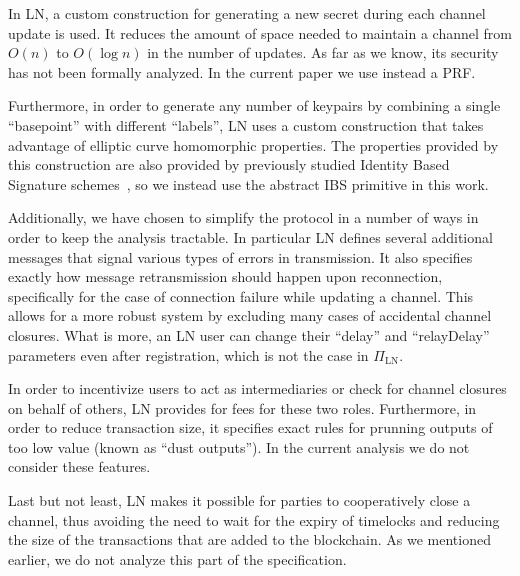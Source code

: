   \begin{remark}

    In LN, a custom construction for generating a new secret during each channel
    update is used. It reduces the amount of space needed to maintain a channel
    from $O(n)$ to $O(\log n)$ in the number of updates. As far as we know, its
    security has not been formally analyzed. In the current paper we use instead
    a PRF.

    Furthermore, in order to generate any number of keypairs by combining a
    single ``basepoint'' with different ``labels'', LN uses a custom
    construction that takes advantage of elliptic curve homomorphic properties.
    The properties provided by this construction are also provided by previously
    studied Identity Based Signature schemes~\cite{ibsshamir,ibspaterson}, so we
    instead use the abstract IBS primitive in this work. 

    Additionally, we have chosen to simplify the protocol in a number of ways in
    order to keep the analysis tractable. In particular LN defines several
    additional messages that signal various types of errors in transmission. It
    also specifies exactly how message retransmission should happen upon
    reconnection, specifically for the case of connection failure while updating
    a channel. This allows for a more robust system by excluding many cases of
    accidental channel closures. What is more, an LN user can change their
    ``delay'' and ``relayDelay'' parameters even after registration, which is
    not the case in $\Pi_{\mathrm{LN}}$.

    In order to incentivize users to act as intermediaries or check for channel
    closures on behalf of others, LN provides for fees for these two roles.
    Furthermore, in order to reduce transaction size, it specifies exact rules
    for prunning outputs of too low value (known as ``dust outputs''). In the
    current analysis we do not consider these features.

    Last but not least, LN makes it possible for parties to cooperatively close
    a channel, thus avoiding the need to wait for the expiry of timelocks and
    reducing the size of the transactions that are added to the blockchain. As
    we mentioned earlier, we do not analyze this part of the specification.
  \end{remark}
